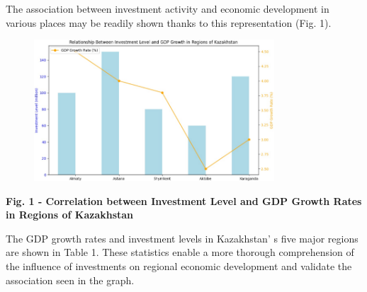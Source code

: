 The association between investment activity and economic development in
various places may be readily shown thanks to this representation (Fig.
1).

\begin{figure}[H]
	\centering
	\includegraphics[width=0.8\textwidth]{media/ekon2/image3}
	\caption*{}
\end{figure}


{\bfseries Fig. 1 - Correlation between Investment Level and GDP Growth
Rates in Regions of Kazakhstan}

The GDP growth rates and investment levels in
Kazakhstan' s five major regions are shown in Table 1.
These statistics enable a more thorough comprehension of the influence
of investments on regional economic development and validate the
association seen in the graph.


